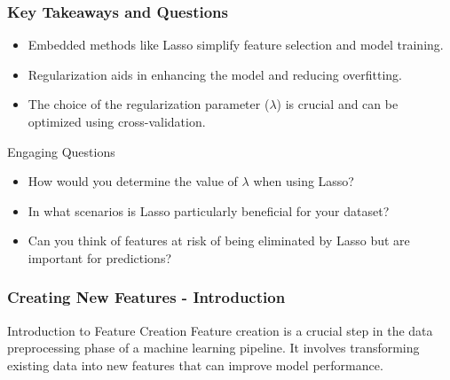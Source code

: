\documentclass[aspectratio=169]{beamer}
\begin{document}
\begin{frame}[fragile]
    \frametitle{Key Takeaways and Questions}
    \begin{itemize}
        \item Embedded methods like Lasso simplify feature selection and model training.
        \item Regularization aids in enhancing the model and reducing overfitting.
        \item The choice of the regularization parameter (\( \lambda \)) is crucial and can be optimized using cross-validation.
    \end{itemize}
    \begin{block}{Engaging Questions}
        \begin{itemize}
            \item How would you determine the value of \( \lambda \) when using Lasso?
            \item In what scenarios is Lasso particularly beneficial for your dataset?
            \item Can you think of features at risk of being eliminated by Lasso but are important for predictions?
        \end{itemize}
    \end{block}
\end{frame}

\begin{frame}[fragile]
    \frametitle{Creating New Features - Introduction}
    \begin{block}{Introduction to Feature Creation}
        Feature creation is a crucial step in the data preprocessing phase of a machine learning pipeline. It involves transforming existing data into new features that can improve model performance.
    \end{block}
\end{frame}
\end{document}
